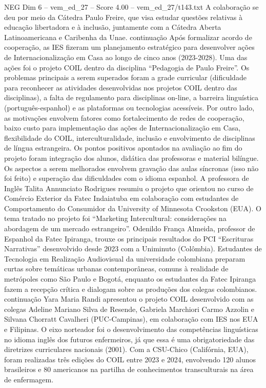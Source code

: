 \begin{textsample}{NEG Dim 6 – vem\_ed\_27 – Score 4.00 – vem\_ed\_27/t143.txt}
A colaboração se deu por meio da Cátedra Paulo Freire, que visa estudar questões relativas à educação libertadora e à inclusão, juntamente com a Cátedra Aberta Latinoamericana e Caribenha da Unae. continuação Após formalizar acordo de cooperação, as IES fizeram um planejamento estratégico para desenvolver ações de Internacionalização em Casa ao longo de cinco anos (2023-2028).
Uma das ações foi o projeto COIL dentro da disciplina “Pedagogia de Paulo Freire”.
Os problemas principais a serem superados foram a grade curricular (dificuldade para reconhecer as atividades desenvolvidas nos projetos COIL dentro das disciplinas), a falta de regulamento para disciplinas on-line, a barreira linguística (português-espanhol) e as plataformas ou tecnologias acessíveis.
Por outro lado, as motivações envolvem fatores como fortalecimento de redes de cooperação, baixo custo para implementação das ações de Internacionalização em Casa, flexibilidade do COIL, interculturalidade, inclusão e envolvimento de disciplinas de língua estrangeira.
Os pontos positivos apontados na avaliação ao fim do projeto foram integração dos alunos, didática das professoras e material bilíngue.
Os aspectos a serem melhorados envolvem gravação das aulas síncronas (isso não foi feito) e superação das dificuldades com o idioma espanhol.
A professora de Inglês Talita Annunciato Rodrigues resumiu o projeto que orientou no curso de Comércio Exterior da Fatec Indaiatuba em colaboração com estudantes de Comportamento do Consumidor da University of Minnesota Crookston (EUA).
O tema tratado no projeto foi “Marketing Intercultural: considerações na abordagem de um mercado estrangeiro”.
Odenildo França Almeida, professor de Espanhol da Fatec Ipiranga, trouxe os principais resultados do PCI “Escrituras Narrativas” desenvolvido desde 2023 com a Uniminuto (Colômbia).
Estudantes de Tecnologia em Realização Audiovisual da universidade colombiana preparam curtas sobre temáticas urbanas contemporâneas, comuns à realidade de metrópoles como São Paulo e Bogotá, enquanto os estudantes da Fatec Ipiranga fazem a recepção crítica e dialogam sobre as produções dos colegas colombianos. continuação Yara Maria Randi apresentou o projeto COIL desenvolvido com as colegas Adeline Mariano Silva de Resende, Gabriela Marchiori Carmo Azzolin e Silvana Chorratt Cavalheri (PUC-Campinas), em colaboração com IES nos EUA e Filipinas.
O eixo norteador foi o desenvolvimento das competências linguísticas no idioma inglês dos futuros enfermeiros, já que essa é uma obrigatoriedade das diretrizes curriculares nacionais (2001).
Com a CSU-Chico (Califórnia, EUA), foram realizadas três edições do COIL entre 2023 e 2024, envolvendo 120 alunos brasileiros e 80 americanos na partilha de conhecimentos transculturais na área de enfermagem.

\end{textsample}
